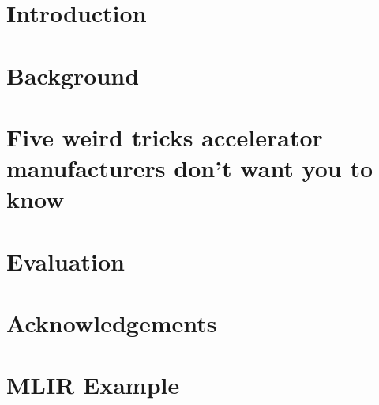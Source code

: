 \documentclass[sigconf,techreport]{acmart}
\begin{document}


\maketitle

\tableofcontents

\section{Introduction}\label{sec:introduction}


\section{Background}\label{sec:background}


\section{Five weird tricks accelerator manufacturers don't want you to know}\label{sec:methodology}


\section{Evaluation}\label{sec:evaluation}


\section{Acknowledgements}




\appendix

\section{MLIR Example}\label{sec:mlir_example}

\end{document}
